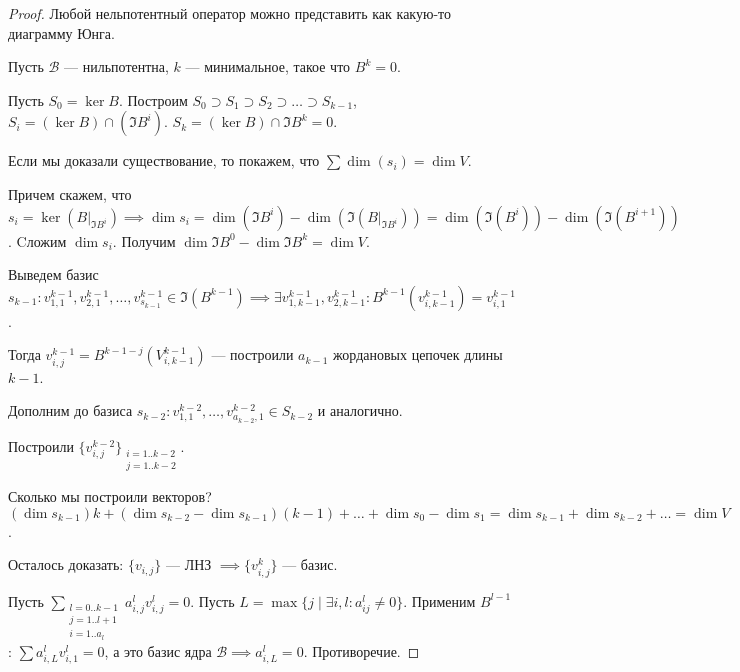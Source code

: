 \begin{proof}
    Любой нельпотентный оператор можно представить как какую-то диаграмму Юнга. 

    Пусть $\mathcal{B}$ --- нильпотентна,  $k$ --- минимальное, такое что  $B^k = 0$. 

    Пусть  $S_0 = \ker B$. Построим  $S_0 \supset S_1 \supset S_2 \supset \ldots \supset S_{k-1}$, $S_i = (\ker B) \cap (\Im B^i)$. $S_k = (\ker B) \cap \Im B^k = 0$.
    
    Если мы доказали существование, то покажем, что  $\sum \dim (s_i) = \dim V$.

    Причем скажем, что $s_i = \ker(B \Big|_{\Im B^i}) \implies \dim s_i = \dim (\Im B^i) - \dim(\Im(B\Big|_{\Im B^i})) = \dim (\Im (B^i)) - \dim(\Im(B^{i+1}))$. Cложим  $\dim s_i$. Получим  $\dim \Im B^0 - \dim \Im B^k = \dim V$. 

    Выведем базис $s_{k-1}\!: v_{1,1}^{k-1}, v_{2, 1}^{k-1}, \ldots, v_{s_{k-1}}^{k-1} \in \Im(B^{k-1}) \implies \exists v_{1, k-1}^{k-1}, v_{2, k - 1}^{k-1}\!: B^{k-1} (v_{i, k - 1}^{k-1}) = v_{i, 1}^{k-1}$.

    Тогда $v_{i,j}^{k-1} = B^{k-1-j}(V_{i, k-1}^{k-1})$ --- построили  $a_{k-1}$ жордановых цепочек длины  $k-1$. 

    Дополним до базиса $s_{k-2}\!: v_{1,1}^{k-2}, \ldots, v_{a_{k-2}, 1}^{k-2} \in S_{k-2}$ и аналогично.

    Построили $\{v_{i, j}^{k-2}\}_{\substack{i=1..k-2\\j=1..k-2}}$. 

    Сколько мы построили векторов? $(\dim s_{k-1}) k + (\dim s_{k-2} - \dim s_{k-1})(k-1) + \ldots + \dim s_0 - \dim s_1 = \dim s_{k-1} + \dim s_{k-2} + \ldots = \dim V$.

    Осталось доказать: $\{v_{i, j}\}$ --- ЛНЗ  $\implies \{v_{i, j}^k\}$ --- базис.

    Пусть  $\sum_{\substack{l=0..k-1\\j=1..l+1\\i=1..a_l}} a_{i, j}^l v_{i, j}^l = 0$. Пусть  $L = \max\{j \mid \exists i, l\!: a_{ij}^l \neq 0\}$. Применим  $B^{l-1}$:  $\sum a_{i, L}^l v_{i, 1}^l = 0$, а это базис ядра  $\mathcal{B} \implies a_{i, L}^l = 0$. Противоречие. 
\end{proof}

